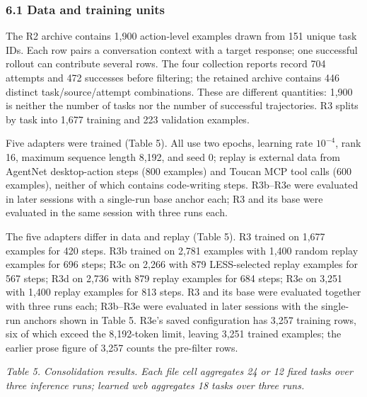 \documentclass[
  10pt,
]{article}
\begin{document}
\subsubsection{6.1 Data and training
units}\label{data-and-training-units}

The R2 archive contains 1,900 action-level examples drawn from 151
unique task IDs. Each row pairs a conversation context with a target
response; one successful rollout can contribute several rows. The four
collection reports record 704 attempts and 472 successes before
filtering; the retained archive contains 446 distinct
task/source/attempt combinations. These are different quantities: 1,900
is neither the number of tasks nor the number of successful
trajectories. R3 splits by task into 1,677 training and 223 validation
examples.

Five adapters were trained (Table 5). All use two epochs, learning rate
\(10^{-4}\), rank 16, maximum sequence length 8,192, and seed 0; replay
is external data from AgentNet desktop-action steps (800 examples) and
Toucan MCP tool calls (600 examples), neither of which contains
code-writing steps. R3b--R3e were evaluated in later sessions with a
single-run base anchor each; R3 and its base were evaluated in the same
session with three runs each.

The five adapters differ in data and replay (Table 5). R3 trained on
1,677 examples for 420 steps. R3b trained on 2,781 examples with 1,400
random replay examples for 696 steps; R3c on 2,266 with 879
LESS-selected replay examples for 567 steps; R3d on 2,736 with 879
replay examples for 684 steps; R3e on 3,251 with 1,400 replay examples
for 813 steps. R3 and its base were evaluated together with three runs
each; R3b--R3e were evaluated in later sessions with the single-run
anchors shown in Table 5. R3e's saved configuration has 3,257 training
rows, six of which exceed the 8,192-token limit, leaving 3,251 trained
examples; the earlier prose figure of 3,257 counts the pre-filter rows.

\emph{Table 5. Consolidation results. Each file cell aggregates 24 or 12
fixed tasks over three inference runs; learned web aggregates 18 tasks
over three runs.}
\end{document}
